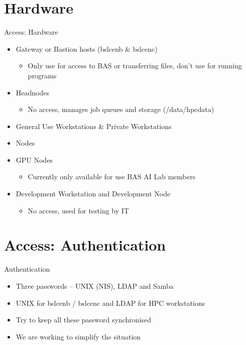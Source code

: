 {
\section{Hardware}
%
\begin{frame}{Access: Hardware}
\begin{itemize}
\item Gateway or Bastion hosts (bslcenb & bslcenc)
\begin{itemize}
\item Only use for access to BAS or transferring files, don’t use for running programs
\end{itemize}
\item Headnodes
	\begin{itemize}
	\item No access, manages job queues and storage (/data/hpcdata)
	\end{itemize}
\item General Use Workstations & Private Workstations
\item Nodes
\item GPU Nodes
	\begin{itemize}
	\item Currently only available for use BAS AI Lab members
	\end{itemize}	
\item Development Workstation and Development Node
	\begin{itemize}
	\item  No access, used for testing by IT
	\end{itemize}
\end{itemize}
\end{frame}
}

{
\section{Access: Authentication}
%
\begin{frame}{Authentication}
\begin{itemize}
\item Three passwords – UNIX (NIS), LDAP and Samba
\item UNIX for bslcenb / bslcenc and LDAP for HPC workstations
\item Try to keep all these password synchronised
\item We are working to simplify the situation
\end{itemize}
\end{frame}
}

